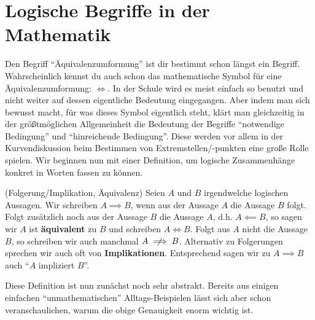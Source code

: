 \section{Logische Begriffe in der Mathematik}
Den Begriff "`Äquivalenzumformung"' ist dir bestimmt schon längst ein Begriff. Wahrscheinlich kennst du auch schon das mathematische Symbol für eine Äquivalenzumformung: \(\iff\). In der Schule wird es meist einfach so benutzt und nicht weiter auf dessen eigentliche Bedeutung eingegangen. Aber indem man sich bewusst macht, für was dieses Symbol eigentlich steht, klärt man gleichzeitig in der größtmöglichen Allgemeinheit die Bedeutung der Begriffe "`notwendige Bedingung"' und "`hinreichende Bedingung"'. Diese werden vor allem in der Kurvendiskussion beim Bestimmen von Extremstellen/-punkten eine große Rolle spielen. Wir beginnen nun mit einer Definition, um logische Zusammenhänge konkret in Worten fassen zu können. 
\begin{definition}(Folgerung/Implikation, Äquivalenz)
    Seien \(A\) und \(B\) irgendwelche logischen Aussagen. Wir schreiben \(A\implies B\), wenn aus der Aussage \(A\) die Aussage \(B\) folgt. Folgt zusätzlich noch aus der Aussage \(B\) die Aussage \(A\), d.h. \(A \impliedby B\), so sagen wir \(A\) ist \textbf{äquivalent} zu \(B\) und schreiben \(A \iff B\). Folgt aus \(A\) nicht die Aussage \(B\), so schreiben wir auch manchmal \(A \centernot\implies B\). Alternativ zu Folgerungen sprechen wir auch oft von \textbf{Implikationen}. Entsprechend sagen wir zu \(A \implies B\) auch "`\(A\) impliziert \(B\)"'. 
\end{definition}
Diese Definition ist nun zunächst noch sehr abstrakt. Bereits aus einigen einfachen "`unmathematischen"' Alltags-Beispielen lässt sich aber schon veranschaulichen, warum die obige Genauigkeit enorm wichtig ist. 
